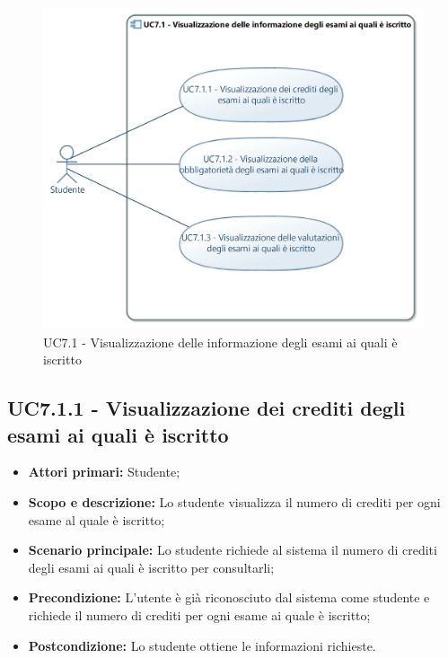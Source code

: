 \documentclass[AnalisiDeiRequisiti.tex]{subfiles}
\begin{document}
\begin{figure}[H]
	\centering
	\includegraphics[width=1.0\linewidth]{UC7_1.jpg}
	\caption{UC7.1 - Visualizzazione delle informazione degli esami ai quali è iscritto}
	\label{fig:UC7.1 - Visualizzazione delle informazione degli esami ai quali e' iscritto} %
\end{figure}

\subsection{UC7.1.1 - Visualizzazione dei crediti degli esami ai quali è iscritto}
\begin{itemize}
\item \textbf{Attori primari:} Studente;\\
\item \textbf{Scopo e descrizione:} Lo studente visualizza il numero di crediti per ogni esame al quale è iscritto;\\
\item \textbf{Scenario principale:} Lo studente richiede al sistema il numero di crediti degli esami ai quali è iscritto per consultarli;\\
\item \textbf{Precondizione:} L'utente è già riconosciuto dal sistema come studente e richiede il numero di crediti per ogni esame ai quale è iscritto;\\
\item \textbf{Postcondizione:} Lo studente ottiene le informazioni richieste.\\
\end{itemize}
\end{document}
